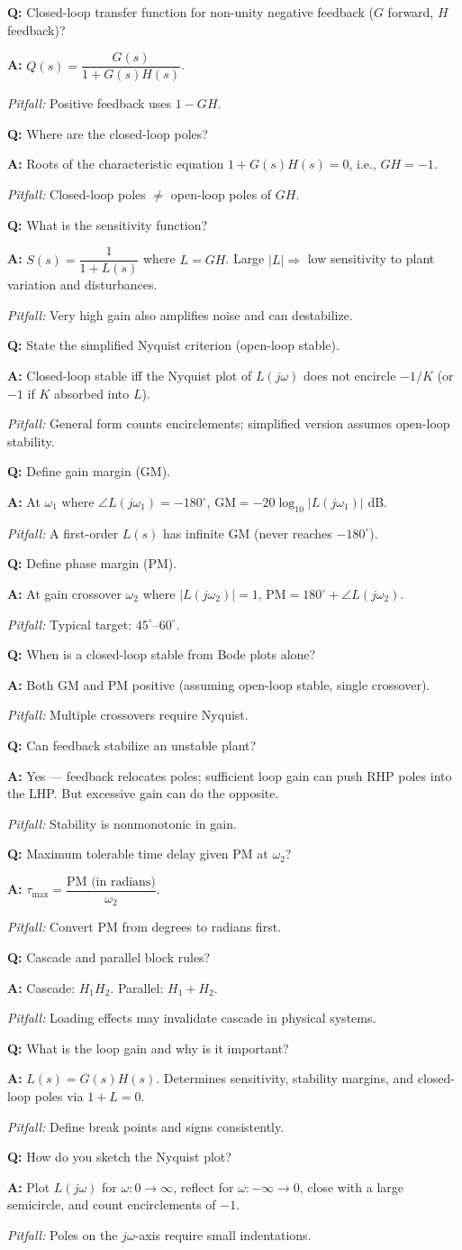 \documentclass[11pt]{article}
\newcommand{\Q}[1]{\par\medskip\noindent\textbf{Q:} #1}
\newcommand{\A}[1]{\par\noindent\textbf{A:} #1}
\newcommand{\Pit}[1]{\par\noindent\textit{Pitfall:} #1}
\begin{document}
\Q{Closed-loop transfer function for non-unity negative feedback ($G$ forward, $H$ feedback)?}
\A{$Q(s) = \dfrac{G(s)}{1 + G(s)H(s)}$.}
\Pit{Positive feedback uses $1-GH$.}

\Q{Where are the closed-loop poles?}
\A{Roots of the characteristic equation $1 + G(s)H(s) = 0$, i.e., $GH = -1$.}
\Pit{Closed-loop poles $\ne$ open-loop poles of $GH$.}

\Q{What is the sensitivity function?}
\A{$S(s) = \dfrac{1}{1+L(s)}$ where $L = GH$. Large $|L| \Rightarrow$ low sensitivity to plant variation and disturbances.}
\Pit{Very high gain also amplifies noise and can destabilize.}

\Q{State the simplified Nyquist criterion (open-loop stable).}
\A{Closed-loop stable iff the Nyquist plot of $L(j\omega)$ does not encircle $-1/K$ (or $-1$ if $K$ absorbed into $L$).}
\Pit{General form counts encirclements; simplified version assumes open-loop stability.}

\Q{Define gain margin (GM).}
\A{At $\omega_1$ where $\angle L(j\omega_1) = -180^\circ$, $\text{GM} = -20\log_{10}|L(j\omega_1)|$ dB.}
\Pit{A first-order $L(s)$ has infinite GM (never reaches $-180^\circ$).}

\Q{Define phase margin (PM).}
\A{At gain crossover $\omega_2$ where $|L(j\omega_2)|=1$, $\text{PM} = 180^\circ + \angle L(j\omega_2)$.}
\Pit{Typical target: $45^\circ$--$60^\circ$.}

\Q{When is a closed-loop stable from Bode plots alone?}
\A{Both GM and PM positive (assuming open-loop stable, single crossover).}
\Pit{Multiple crossovers require Nyquist.}

\Q{Can feedback stabilize an unstable plant?}
\A{Yes --- feedback relocates poles; sufficient loop gain can push RHP poles into the LHP. But excessive gain can do the opposite.}
\Pit{Stability is nonmonotonic in gain.}

\Q{Maximum tolerable time delay given PM at $\omega_2$?}
\A{$\tau_{\max} = \dfrac{\text{PM (in radians)}}{\omega_2}$.}
\Pit{Convert PM from degrees to radians first.}

\Q{Cascade and parallel block rules?}
\A{Cascade: $H_1 H_2$. Parallel: $H_1 + H_2$.}
\Pit{Loading effects may invalidate cascade in physical systems.}

\Q{What is the loop gain and why is it important?}
\A{$L(s) = G(s)H(s)$. Determines sensitivity, stability margins, and closed-loop poles via $1+L=0$.}
\Pit{Define break points and signs consistently.}

\Q{How do you sketch the Nyquist plot?}
\A{Plot $L(j\omega)$ for $\omega:0\to\infty$, reflect for $\omega:-\infty\to 0$, close with a large semicircle, and count encirclements of $-1$.}
\Pit{Poles on the $j\omega$-axis require small indentations.}
\end{document}
